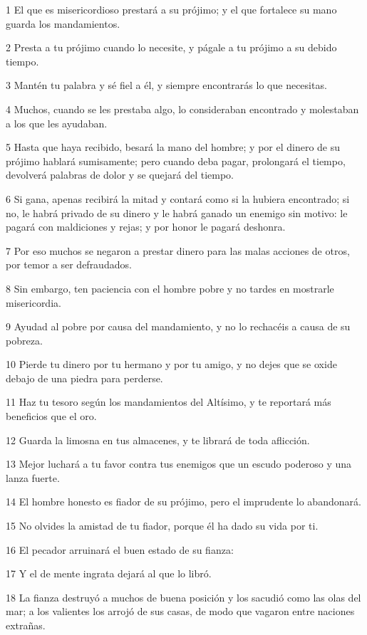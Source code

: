 \par 1 El que es misericordioso prestará a su prójimo; y el que fortalece su mano guarda los mandamientos.
\par 2 Presta a tu prójimo cuando lo necesite, y págale a tu prójimo a su debido tiempo.
\par 3 Mantén tu palabra y sé fiel a él, y siempre encontrarás lo que necesitas.
\par 4 Muchos, cuando se les prestaba algo, lo consideraban encontrado y molestaban a los que les ayudaban.
\par 5 Hasta que haya recibido, besará la mano del hombre; y por el dinero de su prójimo hablará sumisamente; pero cuando deba pagar, prolongará el tiempo, devolverá palabras de dolor y se quejará del tiempo.
\par 6 Si gana, apenas recibirá la mitad y contará como si la hubiera encontrado; si no, le habrá privado de su dinero y le habrá ganado un enemigo sin motivo: le pagará con maldiciones y rejas; y por honor le pagará deshonra.
\par 7 Por eso muchos se negaron a prestar dinero para las malas acciones de otros, por temor a ser defraudados.
\par 8 Sin embargo, ten paciencia con el hombre pobre y no tardes en mostrarle misericordia.
\par 9 Ayudad al pobre por causa del mandamiento, y no lo rechacéis a causa de su pobreza.
\par 10 Pierde tu dinero por tu hermano y por tu amigo, y no dejes que se oxide debajo de una piedra para perderse.
\par 11 Haz tu tesoro según los mandamientos del Altísimo, y te reportará más beneficios que el oro.
\par 12 Guarda la limosna en tus almacenes, y te librará de toda aflicción.
\par 13 Mejor luchará a tu favor contra tus enemigos que un escudo poderoso y una lanza fuerte.
\par 14 El hombre honesto es fiador de su prójimo, pero el imprudente lo abandonará.
\par 15 No olvides la amistad de tu fiador, porque él ha dado su vida por ti.
\par 16 El pecador arruinará el buen estado de su fianza:
\par 17 Y el de mente ingrata dejará al que lo libró.
\par 18 La fianza destruyó a muchos de buena posición y los sacudió como las olas del mar; a los valientes los arrojó de sus casas, de modo que vagaron entre naciones extrañas.
